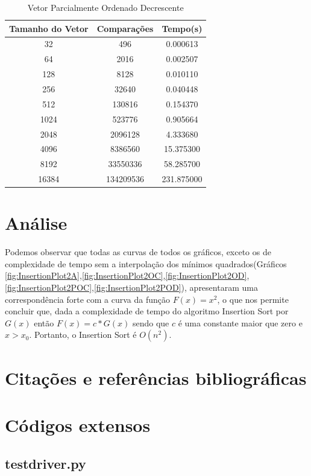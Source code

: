 \documentclass[12pt,a4paper,twoside]{report}
\begin{document}
\begin{table}[h]
  \centering
  \caption{Vetor Parcialmente Ordenado Decrescente \label{tab:pod}}
  \begin{tabular}{ccc} \\\hline
  \textbf{Tamanho do Vetor} & \textbf{Comparações} & \textbf{Tempo(s)} \\\hline
  32                        & 496                  & 0.000613          \\\hline
  64                        & 2016                 & 0.002507          \\\hline
  128                       & 8128                 & 0.010110          \\\hline
  256                       & 32640                & 0.040448          \\\hline
  512                       & 130816               & 0.154370          \\\hline
  1024                      & 523776               & 0.905664          \\\hline
  2048                      & 2096128              & 4.333680          \\\hline
  4096                      & 8386560              & 15.375300         \\\hline
  8192                      & 33550336             & 58.285700        \\\hline
  16384                     & 134209536            & 231.875000        \\\hline
  \end{tabular}
\end{table}


\chapter{Análise}

Podemos observar que todas as curvas de todos os gráficos, exceto os de complexidade de tempo sem a interpolação dos mínimos quadrados(Gráficos \ref{fig:InsertionPlot2A},\ref{fig:InsertionPlot2OC},\ref{fig:InsertionPlot2OD},\ref{fig:InsertionPlot2POC},\ref{fig:InsertionPlot2POD}), apresentaram uma correspondência forte com a curva da função $F(x) = x^2$, o que nos permite concluir que, dada a complexidade de tempo do algoritmo Insertion Sort por $G(x)$ então $F(x) = c * G(x)$ sendo que $c$ é uma constante maior que zero e $x > x_0$. Portanto, o Insertion Sort é $O(n^2)$.

\chapter{Citações e referências bibliográficas}








\clearpage
{}
\appendix

\chapter{Códigos extensos \label{ap:testdriver}}
\section{testdriver.py}

\end{document}
